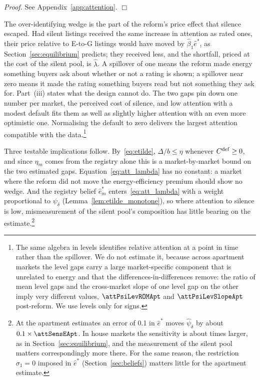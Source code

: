 \noindent\textit{Proof.} See Appendix~\ref{app:attention}. $\Box$

The over-identifying wedge is the part of the reform's price effect that silence escaped. Had silent listings received the same increase in attention as rated ones, their price relative to E-to-G listings would have moved by $\hat\beta_1\hat e^*$, as Section~\ref{sec:equilibrium} predicts; they received less, and the shortfall, priced at the cost of the silent pool, is $\hat\lambda$. A spillover of one means the reform made energy something buyers ask about whether or not a rating is shown; a spillover near zero means it made the rating something buyers read but not something they ask for. Part~(iii) states what the design cannot do. The two gaps pin down one number per market, the perceived cost of silence, and low attention with a modest default fits them as well as slightly higher attention with an even more optimistic one. Normalising the default to zero delivers the largest attention compatible with the data.\footnote{The same algebra in levels identifies relative attention at a point in time rather than the spillover. We do not estimate it, because across apartment markets the level gaps carry a large market-specific component that is unrelated to energy and that the differences-in-differences remove: the ratio of mean level gaps and the cross-market slope of one level gap on the other imply very different values, $\attPsiLevROMApt$ and $\attPsiLevSlopeApt$ post-reform. We use levels only for signs.}

Three testable implications follow. By~\eqref{eq:etilde}, $\Delta/b\le\eta$ whenever $C^{\rm def}\ge0$, and since $\eta_m$ comes from the registry alone this is a market-by-market bound on the two estimated gaps. Equation~\eqref{eq:att_lambda} has no constant: a market where the reform did not move the energy-efficiency premium should show no wedge. And the registry belief $\hat e^*_m$ enters~\eqref{eq:att_lambda} with a weight proportional to $\psi_\delta$ (Lemma~\ref{lem:etilde_monotone}), so where attention to silence is low, mismeasurement of the silent pool's composition has little bearing on the estimate.\footnote{At the apartment estimates an error of 0.1 in $\hat e^*$ moves $\hat\psi_\delta$ by about $0.1\times\attSensEApt$. In house markets the sensitivity is about \attSensRatio{} times larger, as in Section~\ref{sec:equilibrium}, and the measurement of the silent pool matters correspondingly more there. For the same reason, the restriction $\sigma_1=0$ imposed in $\hat e^*$ (Section~\ref{sec:beliefs}) matters little for the apartment estimate.}

